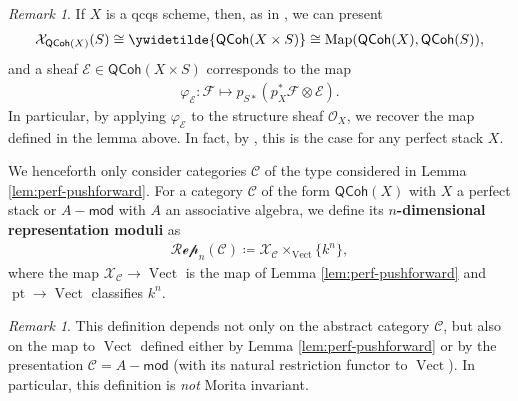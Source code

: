 \documentclass{article}
\numberwithin{equation}{section}
\theoremstyle{quest}
\theoremstyle{definition}
\theoremstyle{remark}
\newtheorem{rmk}[thm]{Remark}
\newcommand{\msf}{\mathsf}
\newcommand{\Mod}{-\msf{mod}}
\DeclareMathOperator{\Map}{Map}
\DeclareMathOperator{\pt}{pt}
\DeclareMathOperator{\Vect}{Vect}
\begin{document}
	


	

	

\begin{rmk}\label{rmk:map-on-perfect-stacks}
	If $X$ is a qcqs scheme, then,  as in \cite[\S8.3]{T06}, we can present
	\begin{align*}
		\mathcal{X}_{\mathsf{QCoh}(X)}(S) \cong\ywidetilde{\mathsf{QCoh}(X\times S)}\cong\Map(\mathsf{QCoh}(X),\mathsf{QCoh}(S)),
	\end{align*} 
	and a sheaf $\mathscr{E}\in \mathsf{QCoh}(X\times S)$ corresponds to the map
	\begin{align*}
		\varphi_\mathscr{E}:\mathscr{F}\mapsto p_{S*}(p_X^*\mathscr{F}\otimes \mathscr{E}).
	\end{align*} 
	In particular, by applying $\varphi_\mathscr{E}$ to the structure sheaf $\mathscr{O}_X$, we recover the map defined in the lemma above. In fact, by \cite[Theorem 4.14]{BFN}, this is the case for any perfect stack $X$.
\end{rmk} 


We henceforth only consider categories $\mathcal{C}$ of the type considered in Lemma \ref{lem:perf-pushforward}. For a category $\mathcal{C}$ of the form $\mathsf{QCoh}(X)$ with $X$ a perfect stack or $A\Mod$ with $A$ an associative algebra, we define its \textbf{${n}$-dimensional representation moduli} as
\begin{align*}
	\mathscr{Rep}_n(\mathcal{C})\coloneqq \mathcal{X}_{\mathcal{C}}\times _{\Vect}\{k^n\} ,
\end{align*} 
where the map $\mathcal{X}_{\mathcal{C}}\to \Vect$ is the map of Lemma \ref{lem:perf-pushforward} and $\pt\to \Vect$ classifies $k^n$.
\begin{rmk}
	This definition depends not only on the abstract category $\mathcal{C}$, but also on the map to $\Vect$ defined either by Lemma \ref{lem:perf-pushforward} or by the presentation $\mathcal{C}=A\Mod$ (with its natural restriction functor to $\Vect$). In particular, this definition is \textit{not} Morita invariant.
\end{rmk} 
\end{document}
